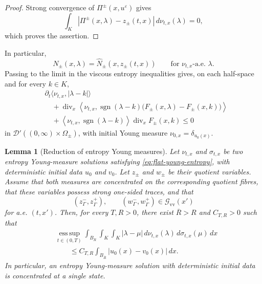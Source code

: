 \documentclass[11pt]{amsart}
\numberwithin{equation}{section}
\theoremstyle{plain}
\newtheorem{lemma}[theorem]{Lemma}
\theoremstyle{definition}
\theoremstyle{remark}
\begin{document}
\begin{proof}
Strong convergence of \(\Pi^\pm(x,u^\varepsilon)\) gives
\[
    \int_K
        |\Pi^\pm(x,\lambda)-z_\pm(t,x)|
    \,d\nu_{t,x}(\lambda)
    =0,
\]
which proves the assertion.
\end{proof}

In particular,
\begin{equation}
\label{eq:flat-normal-flux-young}
    N_\pm(x,\lambda)
    =
    \widehat N_\pm(x,z_\pm(t,x))
    \qquad
    \text{for }\nu_{t,x}\text{-a.e. }\lambda.
\end{equation}
Passing to the limit in the viscous entropy inequalities gives, on each
half-space and for every \(k\in K\),
\begin{equation}
\label{eq:flat-young-entropy}
\begin{aligned}
&\partial_t
    \langle\nu_{t,x},|\lambda-k|\rangle
\\
&\quad+
\operatorname{div}_x
\left\langle
    \nu_{t,x},
    \operatorname{sgn}(\lambda-k)
    \bigl(F_\pm(x,\lambda)-F_\pm(x,k)\bigr)
\right\rangle
\\
&\quad+
\left\langle
    \nu_{t,x},
    \operatorname{sgn}(\lambda-k)
\right\rangle
\operatorname{div}_xF_\pm(x,k)
\leq0
\end{aligned}
\end{equation}
in \(\mathcal D'((0,\infty)\times\Omega_\pm)\), with initial Young
measure \(\nu_{0,x}=\delta_{u_0(x)}\).

\begin{lemma}[Reduction of entropy Young measures]
\label{lem:flat-young-measure-reduction}
Let \(\nu_{t,x}\) and \(\sigma_{t,x}\) be two entropy Young-measure
solutions satisfying \eqref{eq:flat-young-entropy}, with deterministic initial
data \(u_0\) and \(v_0\). Let \(z_\pm\) and \(w_\pm\) be their quotient
variables. Assume that both measures are concentrated on the corresponding
quotient fibres, that these variables possess strong one-sided traces, and
that
\[
    (z^-_\Gamma,z^+_\Gamma),
    \qquad
    (w^-_\Gamma,w^+_\Gamma)
    \in
    \mathcal G_{\mathrm{vv}}(x')
\]
for a.e. \((t,x')\). Then, for every \(T,R>0\), there exist
\(\overline R>R\) and \(C_{T,R}>0\) such that
\begin{equation}
\label{eq:flat-young-measure-stability}
\begin{aligned}
&\operatorname*{ess\,sup}_{t\in(0,T)}
\int_{B_R}\int_K\int_K
    |\lambda-\mu|
\,d\nu_{t,x}(\lambda)
\,d\sigma_{t,x}(\mu)
\,dx
\\
&\qquad\leq
C_{T,R}
\int_{B_{\overline R}}
    |u_0(x)-v_0(x)|\,dx.
\end{aligned}
\end{equation}
In particular, an entropy Young-measure solution with deterministic initial
data is concentrated at a single state.
\end{lemma}
\end{document}
